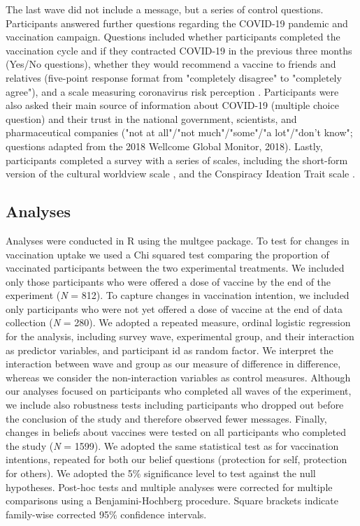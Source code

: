 \documentclass[authordate, empirical]{jote-new-article}
\begin{document}
The last wave did not include a message, but a series of control questions. Participants answered further questions regarding the COVID-19 pandemic and vaccination campaign. Questions included whether participants completed the vaccination cycle and if they contracted COVID-19 in the previous three months (Yes/No questions), whether they would recommend a vaccine to friends and relatives (five-point response format from "completely disagree" to "completely agree"), and a scale measuring coronavirus risk perception \parencites{Savadori2021}. Participants were also asked their main source of information about COVID-19 (multiple choice question) and their trust in the national government, scientists, and pharmaceutical companies ("not at all"/"not much"/"some"/"a lot"/"don't know"; questions adapted from the 2018 Wellcome Global Monitor, 2018). Lastly, participants completed a survey with a series of scales, including the short-form version of the cultural worldview scale \parencites{Kahan2021}, and the Conspiracy Ideation Trait scale \parencites{Bode2018}.



\subsection{Analyses}



Analyses were conducted in R \parencites{Team2018} using the multgee \parencites{Touloumis2013} package. To test for changes in vaccination uptake we used a Chi squared test comparing the proportion of vaccinated participants between the two experimental treatments. We included only those participants who were offered a dose of vaccine by the end of the experiment (\emph{N }= 812). To capture changes in vaccination intention, we included only participants who were not yet offered a dose of vaccine at the end of data collection (\emph{N }= 280). We adopted a repeated measure, ordinal logistic regression for the analysis, including survey wave, experimental group, and their interaction as predictor variables, and participant id as random factor. We interpret the interaction between wave and group as our measure of difference in difference, whereas we consider the non-interaction variables as control measures. Although our analyses focused on participants who completed all waves of the experiment, we include also robustness tests including participants who dropped out before the conclusion of the study and therefore observed fewer messages. Finally, changes in beliefs about vaccines were tested on all participants who completed the study (\emph{N }= 1599). We adopted the same statistical test as for vaccination intentions, repeated for both our belief questions (protection for self, protection for others). We adopted the 5\% significance level to test against the null hypotheses. Post-hoc tests and multiple analyses were corrected for multiple comparisons using a Benjamini-Hochberg procedure. Square brackets indicate family-wise corrected 95\% confidence intervals.
\end{document}
